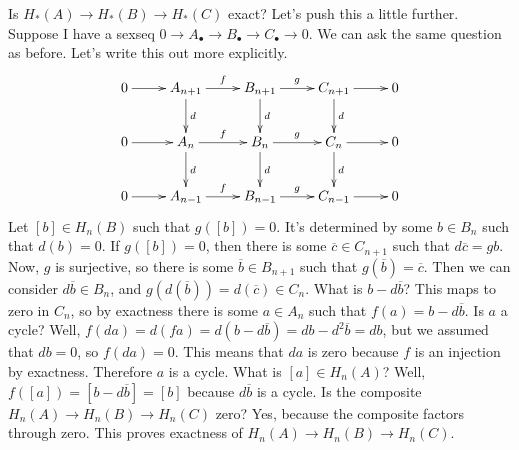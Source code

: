Is $ H_\ast(A)\to H_\ast(B)\to H_\ast(C)$ exact? Let's push this a little further. Suppose I have a sexseq $0\to A_\bullet\to B_\bullet\to C_\bullet\to 0$. We can ask the same question as before. Let's write this out more explicitly.
\begin{equation*}
\xymatrix{0\ar[r] & A_{n+1}\ar[r]^f\ar[d]^d & B_{n+1}\ar[r]^g\ar[d]^d & C_{n+1}\ar[r]\ar[d]^d & 0\\
0\ar[r] & A_n\ar[r]^f\ar[d]^d & B_n\ar[r]^g\ar[d]^d & C_n\ar[r]\ar[d]^d & 0\\
0\ar[r] & A_{n-1}\ar[r]^f & B_{n-1}\ar[r]^g & C_{n-1}\ar[r] & 0}
\end{equation*}
Let $[b]\in H_n(B)$ such that $g([b])=0$. It's determined by some $b\in B_n$ such that $d(b)=0$. If $g([b])=0$, then there is some $\overline{c}\in C_{n+1}$ such that $d\overline{c}=gb$. Now, $g$ is surjective, so there is some $\overline{b}\in B_{n+1}$ such that $g(\overline{b})=\overline{c}$. Then we can consider $d\overline{b}\in B_n$, and $g(d(\overline{b}))=d(\overline{c})\in C_n$. What is $b-d\overline{b}$? This maps to zero in $C_n$, so by exactness there is some $a\in A_n$ such that $f(a)=b-d\overline{b}$. Is $a$ a cycle? Well, $f(da)=d(fa)=d(b-d\overline{b})=db-d^2\overline{b}=db$, but we assumed that $db=0$, so $f(da)=0$. This means that $da$ is zero because $f$ is an injection by exactness. Therefore $a$ is a cycle. What is $[a]\in H_n(A)$? Well, $f([a])=[b-d\overline{b}]=[b]$ because $d\overline{b}$ is a cycle. Is the composite $ H_n(A)\to H_n(B)\to H_n(C)$ zero? Yes, because the composite factors through zero. This proves exactness of $ H_n(A)\to H_n(B)\to H_n(C)$.

